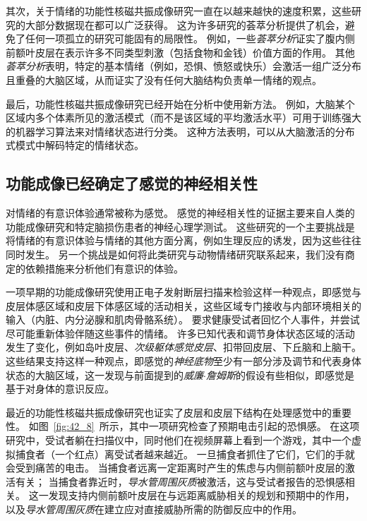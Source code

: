 其次，关于情绪的功能性核磁共振成像研究一直在以越来越快的速度积累，这些研究的大部分数据现在都可以广泛获得。
这为许多研究的荟萃分析提供了机会，避免了任何一项孤立的研究可能固有的局限性。
例如，一些\textit{荟萃分析}证实了腹内侧前额叶皮层在表示许多不同类型刺激（包括食物和金钱）价值方面的作用。
其他\textit{荟萃分析}表明，特定的基本情绪（例如，恐惧、愤怒或快乐）会激活一组广泛分布且重叠的大脑区域，从而证实了没有任何大脑结构负责单一情绪的观点。


最后，功能性核磁共振成像研究已经开始在分析中使用新方法。
例如，大脑某个区域内多个体素所见的激活​​模式（而不是该区域的平均激活水平）可用于训练强大的机器学习算法来对情绪状态进行分类。
这种方法表明，可以从大脑激活的分布式模式中解码特定的情绪状态。



\subsection{功能成像已经确定了感觉的神经相关性}

对情绪的有意识体验通常被称为感觉。
感觉的神经相关性的证据主要来自人类的功能成像研究和特定脑损伤患者的神经心理学测试。
这些研究的一个主要挑战是将情绪的有意识体验与情绪的其他方面分离，例如生理反应的诱发，因为这些往往同时发生。
另一个挑战是如何将此类研究与动物情绪研究联系起来，我们没有商定的依赖措施来分析他们有意识的体验。


一项早期的功能成像研究使用正电子发射断层扫描来检验这样一种观点，即感觉与皮层体感区域和皮层下体感区域的活动相关，这些区域专门接收与内部环境相关的输入（内脏、内分泌腺和肌肉骨骼系统）。
要求健康受试者回忆个人事件，并尝试尽可能重新体验伴随这些事件的情绪。
许多已知代表和调节身体状态区域的活动发生了变化，例如岛叶皮层、\textit{次级躯体感觉皮层}、扣带回皮层、下丘脑和上脑干。
这些结果支持这样一种观点，即感觉的\textit{神经底物}至少有一部分涉及调节和代表身体状态的大脑区域，这一发现与前面提到的\textit{威廉$\cdot$詹姆斯}的假设有些相似，即感觉是基于对身体的意识反应。


最近的功能性核磁共振成像研究也证实了皮层和皮层下结构在处理感觉中的重要性。
如图~\ref{fig:42_8}~所示，其中一项研究检查了预期电击引起的恐惧感。
在这项研究中，受试者躺在扫描仪中，同时他们在视频屏幕上看到一个游戏，其中一个虚拟捕食者（一个红点）离受试者越来越近。
一旦捕食者抓住了它们，它们的手就会受到痛苦的电击。
当捕食者远离一定距离时产生的焦虑与内侧前额叶皮层的激活有关；
当捕食者靠近时，\textit{导水管周围灰质}被激活，这与受试者报告的恐惧感相关。
这一发现支持内侧前额叶皮层在与远距离威胁相关的规划和预期中的作用，以及\textit{导水管周围灰质}在建立应对直接威胁所需的防御反应中的作用。


